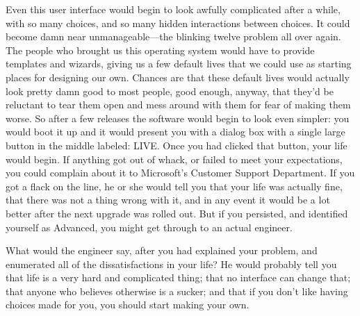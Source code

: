\documentclass[
  fontsize=11pt,
  paper=landscape,
  twocolumn=true,
  pagesize=pdftex,
  headings=small,
  DIV=15,
  ]{scrartcl}
\begin{document}
Even this user interface would begin to look awfully complicated after a
while, with so many choices, and so many hidden interactions between
choices. It could become damn near unmanageable---the blinking twelve
problem all over again. The people who brought us this operating system
would have to provide templates and wizards, giving us a few default
lives that we could use as starting places for designing our own.
Chances are that these default lives would actually look pretty damn
good to most people, good enough, anyway, that they'd be reluctant to
tear them open and mess around with them for fear of making them worse.
So after a few releases the software would begin to look even simpler:
you would boot it up and it would present you with a dialog box with a
single large button in the middle labeled: LIVE. Once you had clicked
that button, your life would begin. If anything got out of whack, or
failed to meet your expectations, you could complain about it to
Microsoft's Customer Support Department. If you got a flack on the line,
he or she would tell you that your life was actually fine, that there
was not a thing wrong with it, and in any event it would be a lot better
after the next upgrade was rolled out. But if you persisted, and
identified yourself as Advanced, you might get through to an actual
engineer.

What would the engineer say, after you had explained your problem, and
enumerated all of the dissatisfactions in your life? He would probably
tell you that life is a very hard and complicated thing; that no
interface can change that; that anyone who believes otherwise is a
sucker; and that if you don't like having choices made for you, you
should start making your own.
\end{document}
